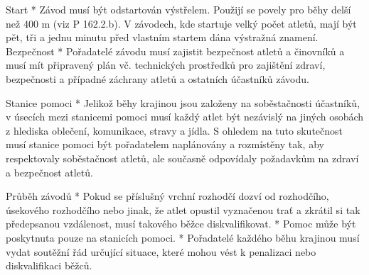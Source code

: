 Start
* Závod musí být odstartován výstřelem. Použijí se povely pro běhy delší než 400 m (viz P 162.2.b). V závodech, kde startuje velký počet atletů, mají být pět, tři a jednu minutu před vlastním startem dána výstražná znamení.
Bezpečnost
* Pořadatelé závodu musí zajistit bezpečnost atletů a činovníků a musí mít připravený plán vč. technických prostředků pro zajištění zdraví, bezpečnosti a případné záchrany atletů a ostatních účastníků závodu.

Stanice pomoci
* Jelikož běhy krajinou jsou založeny na soběstačnosti účastníků, v úsecích mezi stanicemi pomoci musí každý atlet být nezávislý na jiných osobách z hlediska oblečení, komunikace, stravy a jídla. S ohledem na tuto skutečnost musí stanice pomoci být pořadatelem naplánovány a rozmístěny tak, aby respektovaly soběstačnost atletů, ale současně odpovídaly požadavkům na zdraví a bezpečnost atletů.

Průběh závodů
* Pokud se příslušný vrchní rozhodčí dozví od rozhodčího, úsekového rozhodčího nebo jinak, že atlet opustil vyznačenou trať a zkrátil si tak předepsanou vzdálenost, musí takového běžce diskvalifikovat.
* Pomoc může být poskytnuta pouze na stanicích pomoci.
* Pořadatelé každého běhu krajinou musí vydat soutěžní řád určující situace, které mohou vést k penalizaci nebo diskvalifikaci běžců.
\enditems

\endinput
